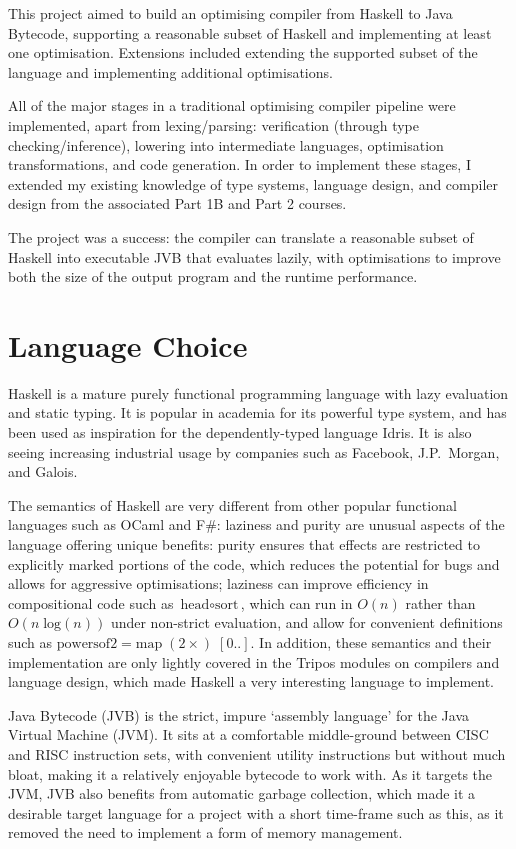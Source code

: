 \documentclass[dissertation.tex]{subfiles}
\begin{document}
This project aimed to build an optimising compiler from Haskell to Java Bytecode, supporting a reasonable subset of Haskell and implementing at least one optimisation. Extensions included extending the supported subset of the language and implementing additional optimisations.

All of the major stages in a traditional optimising compiler pipeline were implemented, apart from lexing/parsing: verification (through type checking/inference), lowering into intermediate languages, optimisation transformations, and code generation. In order to implement these stages, I extended my existing knowledge of type systems, language design, and compiler design from the associated Part 1B and Part 2 courses.

The project was a success: the compiler can translate a reasonable subset of Haskell into executable JVB that evaluates lazily, with optimisations to improve both the size of the output program and the runtime performance.

\section{Language Choice}
{
    Haskell is a mature purely functional programming language with lazy evaluation and static typing. It is popular in academia for its powerful type system, and has been used as inspiration for the dependently-typed language Idris\cite{Idris}. It is also seeing increasing industrial usage by companies such as Facebook\cite{FacebookHaskell}, J.P.\ Morgan\cite{JPHaskell}, and Galois\cite{GaloisHaskell}.

    The semantics of Haskell are very different from other popular functional languages such as OCaml and F\#: laziness and purity are unusual aspects of the language offering unique benefits: purity ensures that effects are restricted to explicitly marked portions of the code, which reduces the potential for bugs and allows for aggressive optimisations; laziness can improve efficiency in compositional code such as \(\text{head} \circ \text{sort}\), which can run in \(O(n)\) rather than \(O(n\;\text{log}(n))\) under non-strict evaluation, and allow for convenient definitions such as \(\text{powersof2} = \text{map}\;(2\times)\;[0..]\). In addition, these semantics and their implementation are only lightly covered in the Tripos modules on compilers and language design, which made Haskell a very interesting language to implement.

    Java Bytecode (JVB) is the strict, impure `assembly language' for the Java Virtual Machine (JVM). It sits at a comfortable middle-ground between CISC and RISC instruction sets, with convenient utility instructions but without much bloat, making it a relatively enjoyable bytecode to work with. As it targets the JVM, JVB also benefits from automatic garbage collection, which made it a desirable target language for a project with a short time-frame such as this, as it removed the need to implement a form of memory management.
}
\end{document}
